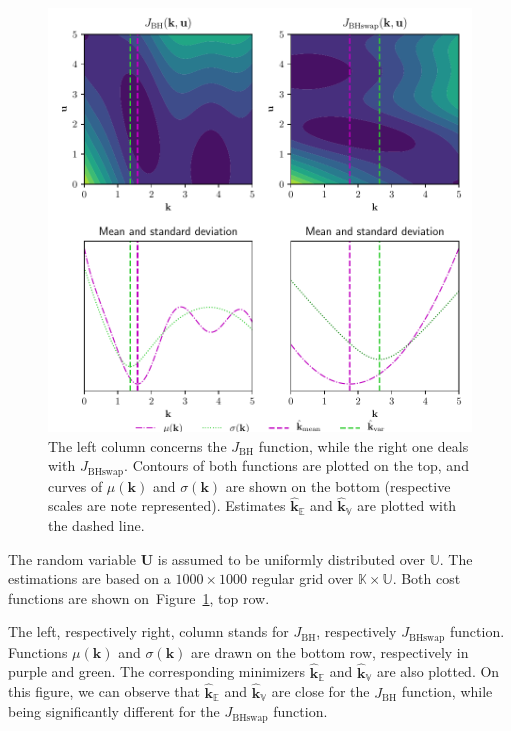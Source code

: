 \documentclass[preprint, 1p]{elsarticle}
\newcommand{\Ex}{\mathbb{E}}
\newcommand{\kmean}{{\mathbf{k}}_{\Ex}}
\newcommand{\hatkmean}{\hat{\mathbf{k}}_{\Ex}}
\newcommand{\kvar}{{\mathbf{k}}_{\mathbb{V}}}
\newcommand{\hatkvar}{\hat{\mathbf{k}}_{\mathbb{V}}}
\newcommand{\Kspace}{\mathbb{K}}
\newcommand{\Uspace}{\mathbb{U}}
\begin{document}
\begin{figure}[!ht]
  \centering
  \includegraphics[width=12cm]{Figures/branin_side_moments_noscale.pdf}
  \caption{The left column concerns the $J_{\mathrm{BH}}$ function, while the right one deals with $J_{\mathrm{BHswap}}$. Contours of both functions are plotted on the top, and curves of  $\mu(\mathbf{k})$ and $\sigma(\mathbf{k})$ are shown on the bottom (respective scales are note represented). Estimates $\hatkmean$ and $\hatkvar$ are plotted with the dashed line. } \label{fig:branin_moments}
\end{figure}


The random variable $\mathbf{U}$ is assumed to be uniformly distributed over $\Uspace$.
The estimations are %
based on a $1000 \times 1000$ regular grid over $\Kspace\times\Uspace$. Both cost functions are shown on~Figure~\ref{fig:branin_moments}, top row.


 The left, respectively right, column stands for $J_{\mathrm{BH}}$, respectively $J_{\mathrm{BHswap}}$ function. Functions $\mu(\mathbf{k})$ and $\sigma(\mathbf{k})$ are drawn on the bottom row, respectively in purple and green. The corresponding minimizers $\hatkmean$ and $\hatkvar$ are also plotted.
On this figure, we can observe that $\hatkmean$ and $\hatkvar$ are close for the $J_{\mathrm{BH}}$ function, while being significantly different for the $J_{\mathrm{BHswap}}$ function.
\end{document}
